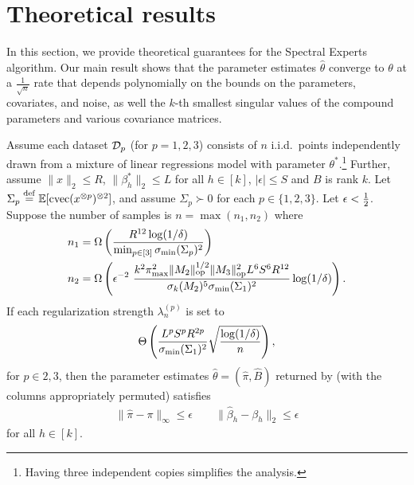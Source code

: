 \section{Theoretical results}
\label{sec:theory}

In this section, we provide theoretical guarantees for the Spectral Experts algorithm.
Our main result shows that the parameter estimates $\hat\theta$ converge to $\theta$
at a $\frac{1}{\sqrt{n}}$ rate that depends polynomially on the bounds on the
parameters, covariates, and noise, as well the $k$-th smallest singular values
of the compound parameters and various covariance matrices.

\begin{theorem}
\label{thm:convergence}
Assume each dataset $\mathcal{D}_p$ (for $p = 1, 2, 3$) consists of $n$ i.i.d.\ points independently drawn from a mixture
of linear regressions model with parameter $\theta^*$.\footnote{Having three independent copies simplifies the analysis.}
Further, assume 
$\|x\|_2 \le R$, 
$\|\beta_h^*\|_2 \le L$ for all $h \in [k]$,
$|\epsilon| \le S$
and $B$ is rank $k$.
Let $\Sigma_p \stackrel{\rm def}{=} \operatorname{\mathbb{E}}[\operatorname{cvec}(x^{\otimes p})^{\otimes 2}]$, 
and assume $\Sigma_p \succ 0$ for each $p \in \{1,2,3\}$.
Let $\epsilon < \frac{1}{2}$.
Suppose the number of samples is
$n = \max(n_1,n_2)$
where 
\begin{align*}
n_1 &= \Omega \left(\frac{R^{12} \log(1/\delta)}{\min_{p \in [3]} \sigma_\text{\rm min}(\Sigma_p)^2} \right) \\
n_2 &= \Omega \left(\epsilon^{-2}~ \frac{k^2 \pi^2_{\max} \|M_2\|_{\text{\rm op}}^{1/2} \|M_3\|_{\text{\rm op}}^2 { L^{6} S^{6} R^{12}}}{\sigma_k(M_2)^{5} {\sigma_\text{\rm min}(\Sigma_1)^2}} \log(1/\delta) \right).
\end{align*}
If each regularization strength $\lambda_n^{(p)}$ is set to 
$$\Theta\left( \frac{L^p S^p R^{2p}}{\sigma_\text{\rm min}(\Sigma_1)^2} \sqrt{\frac{\log(1/\delta)}{n}} \right),$$
for $p \in 2, 3$,
then the parameter estimates $\hat\theta = (\hat\pi, \hat B)$ returned by
 (with the columns appropriately permuted)
satisfies 
  \begin{align*}
  \|\hat \pi - \pi \|_{\infty} \le \epsilon \quad\quad 
  \|\hat \beta_h - \beta_h\|_2 \le \epsilon
  \end{align*}
  for all $h \in [k]$.
\end{theorem}

